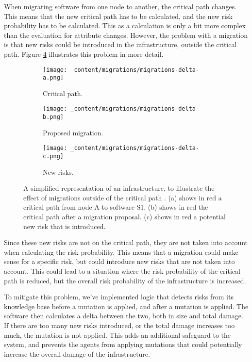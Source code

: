 When migrating software from one node to another, the critical path changes. This means that the new critical path has to be calculated, and the new risk probability has to be calculated. This as a calculation is only a bit more complex than the evaluation for attribute changes. However, the problem with a migration is that new risks could be introduced in the infrastructure, outside the critical path. Figure \ref{fig:migrations-delta} illustrates this problem in more detail.

\begin{figure}[H]
    \begin{subfigure}[b]{0.3\textwidth}
        \centering
        \texttt{[image: \_content/migrations/migrations-delta-a.png]}
        \caption{Critical path.}
        \label{fig:migrations-delta-attack}
    \end{subfigure}
    \begin{subfigure}[b]{0.3\textwidth}
        \centering
        \texttt{[image: \_content/migrations/migrations-delta-b.png]}
        \caption{Proposed migration.}
        \label{fig:migrations-delta-proposal}
    \end{subfigure}
    \begin{subfigure}[b]{0.3\textwidth}
        \centering
        \texttt{[image: \_content/migrations/migrations-delta-c.png]}
        \caption{New risks.}
        \label{fig:migrations-delta-risks}
    \end{subfigure}
    \caption{A simplified representation of an infrastructure, to illustrate the effect of migrations outside of the critical path . (a) shows in red a critical path from node A to software S1. (b) shows in red the critical path after a migration proposal. (c) shows in red a potential new risk that is introduced.}
    \label{fig:migrations-delta}
\end{figure}

Since these new risks are not on the critical path, they are not taken into account when calculating the risk probability. This means that a migration could make sense for a specific risk, but could introduce new risks that are not taken into account. This could lead to a situation where the risk probability of the critical path is reduced, but the overall risk probability of the infrastructure is increased. 

To mitigate this problem, we've implemented logic that detects risks from its knowledge base before a mutation is applied, and after a mutation is applied. The software then calculates a delta between the two, both in size and total damage. If there are too many new risks introduced, or the total damage increases too much, the mutation is not applied. This adds an additional safeguard to the system, and prevents the agents from applying mutations that could potentially increase the overall damage of the infrastructure.
